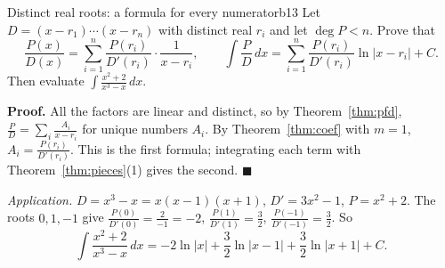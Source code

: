 \documentclass[11pt]{article}
\begin{document}
\begin{exmp}{Distinct real roots: a formula for every numerator}{b13}
Let $D=(x-r_1)\cdots(x-r_n)$ with distinct real $r_i$ and let $\deg P<n$. Prove that
\[\frac{P(x)}{D(x)}=\sum_{i=1}^n\frac{P(r_i)}{D'(r_i)}\cdot\frac1{x-r_i},\qquad\int\frac PD\,dx=\sum_{i=1}^n\frac{P(r_i)}{D'(r_i)}\ln\lvert x-r_i\rvert+C .\]
Then evaluate $\displaystyle\int\frac{x^2+2}{x^3-x}\,dx$.

\textbf{Proof.} All the factors are linear and distinct, so by Theorem~\ref{thm:pfd}, $\frac PD=\sum_i\frac{A_i}{x-r_i}$ for unique numbers $A_i$. By Theorem~\ref{thm:coef} with $m=1$, $A_i=\frac{P(r_i)}{D'(r_i)}$. This is the first formula; integrating each term with Theorem~\ref{thm:pieces}(1) gives the second. $\blacksquare$

\emph{Application.} $D=x^3-x=x(x-1)(x+1)$, $D'=3x^2-1$, $P=x^2+2$. The roots $0,1,-1$ give $\frac{P(0)}{D'(0)}=\frac2{-1}=-2$, $\frac{P(1)}{D'(1)}=\frac32$, $\frac{P(-1)}{D'(-1)}=\frac32$. So
\[\int\frac{x^2+2}{x^3-x}\,dx=-2\ln\lvert x\rvert+\frac32\ln\lvert x-1\rvert+\frac32\ln\lvert x+1\rvert+C .\]
\end{exmp}
\end{document}

